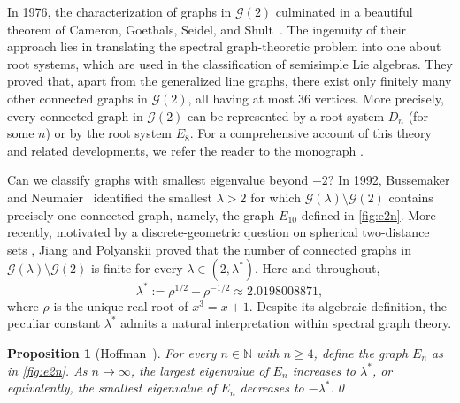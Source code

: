 \documentclass[11pt]{article}
\newtheorem{proposition}[theorem]{Proposition}
\theoremstyle{definition}
\theoremstyle{remark}
\newcommand{\la}{\lambda}
\newcommand{\las}{\lambda^*}
\newcommand{\G}{\mathcal{G}}
\newcommand{\N}{\mathbb{N}}
\begin{document}
In 1976, the characterization of graphs in $\G(2)$ culminated in a beautiful theorem of Cameron, Goethals, Seidel, and Shult~\cite{CGSS76}. The ingenuity of their approach lies in translating the spectral graph-theoretic problem into one about root systems, which are used in the classification of semisimple Lie algebras. They proved that, apart from the generalized line graphs, there exist only finitely many other connected graphs in $\G(2)$, all having at most $36$ vertices. More precisely, every connected graph in $\G(2)$ can be represented by a root system $D_n$ (for some $n$) or by the root system $E_8$. For a comprehensive account of this theory and related developments, we refer the reader to the monograph \cite{CRS04}.

Can we classify graphs with smallest eigenvalue beyond $-2$? In 1992, Bussemaker and Neumaier~\cite[Theorem~2.5]{BN92} identified the smallest $\la > 2$ for which $\G(\la)\setminus \G(2)$ contains precisely one connected graph, namely, the graph $E_{10}$ defined in \cref{fig:e2n}. More recently, motivated by a discrete-geometric question on spherical two-distance sets \cite{JTYZZ23}, Jiang and Polyanskii proved \cite[Theorem~2.10]{JP25} that the number of connected graphs in $\G(\la) \setminus \G(2)$ is finite for every $\la \in (2, \las)$. Here and throughout, \[\las := \rho^{1/2}+\rho^{-1/2} \approx 2.0198008871,\] where $\rho$ is the unique real root of $x^3 = x + 1$. Despite its algebraic definition, the peculiar constant $\las$ admits a natural interpretation within spectral graph theory.

\begin{proposition}[Hoffman~\cite{H72}] \label{lem:e2n}
    For every $n \in \N$ with $n \ge 4$, define the graph $E_n$ as in \cref{fig:e2n}. As $n \to \infty$, the largest eigenvalue of $E_n$ increases to $\las$, or equivalently, the smallest eigenvalue of $E_n$ decreases to $-\las$.\qed
\end{proposition}
\end{document}

